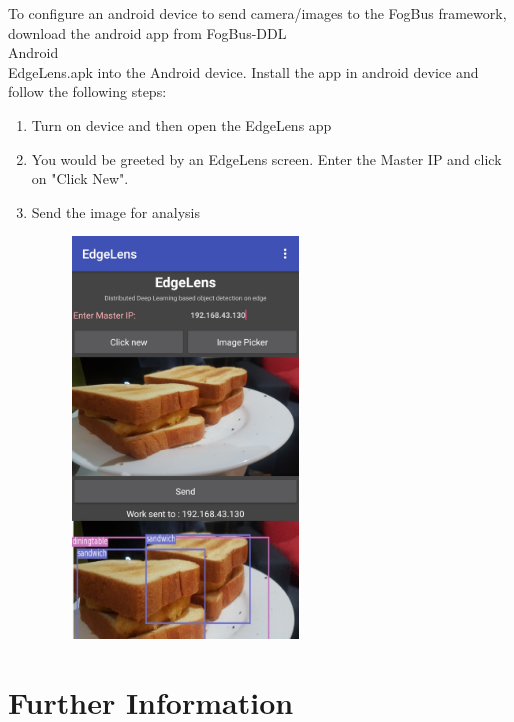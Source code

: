 \documentclass{article}
\begin{document}
To configure an android device to send camera/images to the FogBus framework, download the android app from FogBus-DDL\\Android\\EdgeLens.apk into the Android device. Install the app in android device and follow the following steps:
\begin{enumerate}
\item Turn on device and then open the EdgeLens app
\item You would be greeted by an EdgeLens screen. Enter the Master IP and click on "Click New".
\item Send the image for analysis
\begin{figure}[h]
\centering
\includegraphics[width=6cm]{Screenshot_20190524-210953.jpg}
\end{figure}
\end{enumerate}

\newpage

\section{Further Information}
\end{document}
